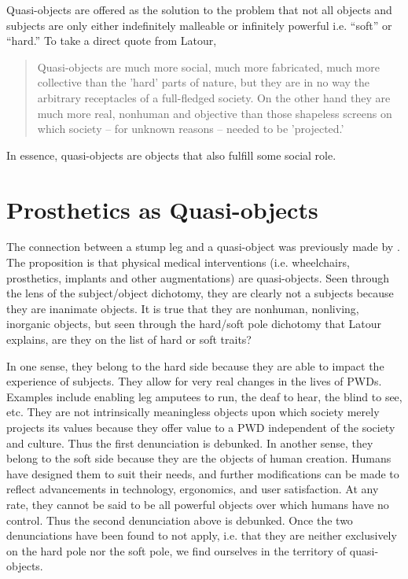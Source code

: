 \documentclass[a4paper]{article}
\begin{document}
\begin{appendices}
Quasi-objects are offered as the solution to the problem that not all objects
and subjects are only either indefinitely malleable or infinitely powerful
i.e. ``soft'' or ``hard.'' To take a direct quote from Latour,
%
\begin{quote}
Quasi-objects are much more social, much more fabricated, much more
collective than the 'hard' parts of nature, but they are in no way the
arbitrary receptacles of a full-fledged society. On the other hand they are
much more real, nonhuman and objective than those shapeless screens on which
society – for unknown reasons – needed to be 'projected.' \citep{latour2012we}
\end{quote}
%
In essence, quasi-objects are objects that also fulfill some social role.


\newpage
\section{Prosthetics as Quasi-objects}
\label{pros-quasi}

The connection between a stump leg and a quasi-object was previously made by
\cite{bertram2018bestial}. The proposition is that physical medical
interventions (i.e. wheelchairs, prosthetics, implants and other
augmentations) are quasi-objects. Seen through the lens of the subject/object
dichotomy, they are clearly not a subjects because they are inanimate objects.
It is true that they are nonhuman, nonliving, inorganic objects, but seen
through the hard/soft pole dichotomy that Latour explains, are they on the
list of hard or soft traits?

In one sense, they belong to the hard side because they are able to impact the
experience of subjects. They allow for very real changes in the lives of PWDs.
Examples include enabling leg amputees to run, the deaf to hear, the blind to
see, etc. They are not intrinsically meaningless objects upon which society
merely projects its values because they offer value to a PWD independent of
the society and culture. Thus the first denunciation is debunked. In another
sense, they belong to the soft side because they are the objects of human
creation. Humans have designed them to suit their needs, and further
modifications can be made to reflect advancements in technology, ergonomics,
and user satisfaction. At any rate, they cannot be said to be all powerful
objects over which humans have no control. Thus the second denunciation above
is debunked. Once the two denunciations have been found to not apply, i.e.
that they are neither exclusively on the hard pole nor the soft pole, we find
ourselves in the territory of quasi-objects.

\end{appendices}
\end{document}
